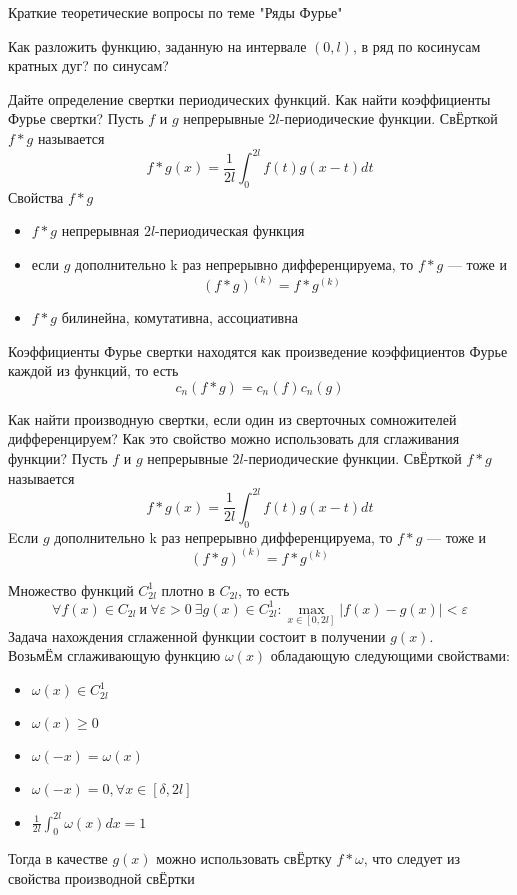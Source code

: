 \documentclass{article}
\begin{document}
\begin{section}{Краткие теоретические вопросы по теме "Ряды Фурье"}
\begin{subsection}{Как разложить функцию, заданную на интервале $(0, l)$, в ряд по косинусам кратных дуг? по синусам?}
\end{subsection}


\begin{subsection}{Дайте определение свертки периодических функций. Как найти коэффициенты Фурье свертки?}
Пусть $f$ и $g$ непрерывные $2l$-периодические функции. СвЁрткой $f*g$ называется 
\[f*g(x) = \frac{1}{2l}\int_0^{2l}f(t)g(x-t)dt\]
Свойства $f*g$
\begin{itemize}
	\item
	$f*g$ непрерывная $2l$-периодическая функция
	\item
	если $g$ дополнительно k раз непрерывно дифференцируема, то $f*g$ --- тоже и 
	\[(f*g)^{(k)} = f*g^{(k)}\]
	\item
	$f*g$ билинейна, комутативна, ассоциативна
\end{itemize}

Коэффициенты Фурье свертки находятся как произведение коэффициентов Фурье каждой из функций, то есть
\[c_n(f*g)=c_n(f)c_n(g)\]
\end{subsection}


\begin{subsection}{Как найти производную свертки, если один из сверточных сомножителей дифференцируем? Как это свойство можно использовать для сглаживания функции?}
Пусть $f$ и $g$ непрерывные $2l$-периодические функции. СвЁрткой $f*g$ называется 
\[f*g(x) = \frac{1}{2l}\int_0^{2l}f(t)g(x-t)dt\]
Eсли $g$ дополнительно k раз непрерывно дифференцируема, то $f*g$ --- тоже и 
\[(f*g)^{(k)} = f*g^{(k)}\]

Множество функций $C_{2l}^1$ плотно в $ C_{2l} $, то есть 
\[ \forall f(x) \in C_{2l} \ \text{и} \ \forall \varepsilon > 0 \  \exists g(x) \in C_{2l}^1: \max_{x \in [0, 2l]}|f(x)-g(x)| < \varepsilon\]
Задача нахождения сглаженной функции состоит в получении $g(x)$.\\
ВозьмЁм сглаживающую функцию $\omega(x)$ обладающую следующими свойствами:
\begin{itemize}
	\item
	$\omega(x) \in C_{2l}^1$
	\item
	$\omega(x) \geq 0$
	\item
	$ \omega(-x)=\omega(x) $
	\item
	$ \omega(-x)=0, \forall x \in [\delta, 2l] $
	\item
	$\frac{1}{2l}\int_0^{2l}\omega(x)dx = 1$
\end{itemize}
Тогда в качестве $g(x)$ можно использовать свЁртку $f*\omega$, что следует из свойства производной свЁртки 
\end{subsection}



\end{section}
\end{document}
